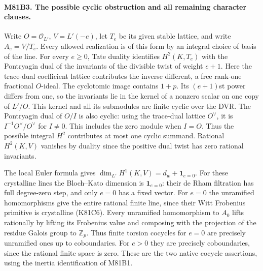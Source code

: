 \paragraph{M81B3. The possible cyclic obstruction and all remaining character clauses.}
Write $O=\mathcal O_{L'}$, $V=L'(-e)$, let $T_e$ be its given
stable lattice, and write $A_e=V/T_e$. Every allowed realization
is of this form by an integral choice of basis of the line.
For every $e\ge0$, Tate duality identifies $H^2(K,T_e)$ with
the Pontryagin dual of the invariants of the divisible twist
of weight $e+1$. Here the trace-dual coefficient lattice contributes
the inverse different, a free rank-one fractional $O$-ideal.
The cyclotomic image contains $1+p$. Its $(e+1)$st power differs
from one, so the invariants lie in the kernel of a nonzero scalar
on one copy of $L'/O$. This kernel and all its submodules are
finite cyclic over the DVR. The Pontryagin dual of $O/I$ is
also cyclic: using the trace-dual lattice $O^\vee$, it is
$I^{-1}O^\vee/O^\vee$ for $I\ne0$. This includes the zero
module when $I=O$. Thus the possible integral $H^2$ contributes
at most one cyclic summand. Rational $H^2(K,V)$ vanishes by
duality since the positive dual twist has zero rational invariants.

The local Euler formula gives
$\dim_{L'}H^1(K,V)=d_w+\mathbf1_{e=0}$.
For these crystalline lines the Bloch--Kato dimension is
$\mathbf1_{e=0}$: their de Rham filtration has full degree-zero
step, and only $e=0$ has a fixed vector.
For $e=0$ the unramified homomorphisms give the entire rational
finite line, since their Witt Frobenius primitive is crystalline
(K81C6). Every unramified homomorphism to $A_0$ lifts rationally
by lifting its Frobenius value and composing with the projection
of the residue Galois group to $\mathbb Z_p$.
Thus finite torsion cocycles for $e=0$ are precisely unramified
ones up to coboundaries. For $e>0$ they are precisely coboundaries,
since the rational finite space is zero. These are the two
native cocycle assertions, using the inertia identification of M81B1.

